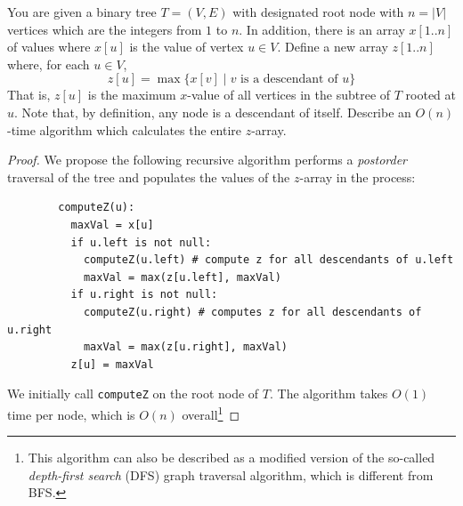 \documentclass{article}
\begin{document}
    \begin{exercise}[DPV 3.19]
      You are given a binary tree $T = (V, E)$ with designated root node with $n = |V|$ vertices which are the integers from $1$ to $n$. In addition, there is an array $x[1..n]$ of values where $x[u]$ is the value of vertex $u \in V$. Define a new array $z[1..n]$ where, for each $u \in V$,	
      \begin{equation}
        z[u] = \max \{ x[v] \mid \text{$v$ is a descendant of $u$}\}
      \end{equation}
      That is, $z[u]$ is the maximum $x$-value of all vertices in the subtree of $T$ rooted at $u$. Note that, by definition, any node is a descendant of itself. Describe an $O(n)$-time algorithm which calculates the entire $z$-array.
    \end{exercise}
    \begin{proof}
      We propose the following recursive algorithm performs a \emph{postorder} traversal of the tree and populates the values of the $z$-array in the process:
      \begin{lstlisting}
        computeZ(u):
          maxVal = x[u]
          if u.left is not null:
            computeZ(u.left) # compute z for all descendants of u.left
            maxVal = max(z[u.left], maxVal)
          if u.right is not null:
            computeZ(u.right) # computes z for all descendants of u.right
            maxVal = max(z[u.right], maxVal)
          z[u] = maxVal
      \end{lstlisting}
      We initially call \texttt{computeZ} on the root node of $T$.        The algorithm takes $O(1)$ time per node, which is $O(n)$ overall\footnote{This algorithm can also be described as a modified version of the so-called \emph{depth-first search} (DFS) graph traversal algorithm, which is different from BFS.}
    \end{proof}
\end{document}
